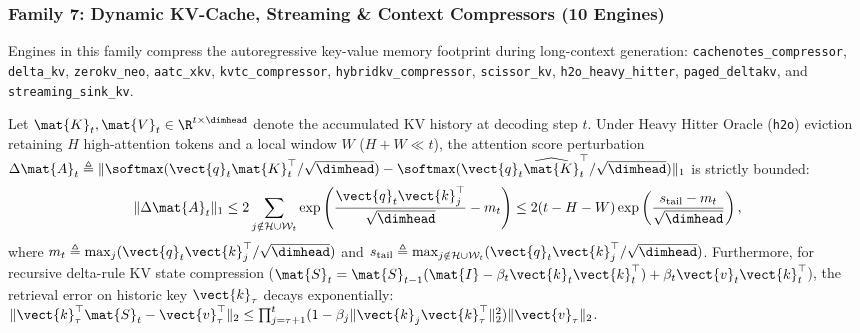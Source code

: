 \subsubsection{Family 7: Dynamic KV-Cache, Streaming \& Context Compressors (10 Engines)}
Engines in this family compress the autoregressive key-value memory footprint during long-context generation: \texttt{cachenotes\_compressor}, \texttt{delta\_kv}, \texttt{zerokv\_neo}, \texttt{aatc\_xkv}, \texttt{kvtc\_compressor}, \texttt{hybridkv\_compressor}, \texttt{scissor\_kv}, \texttt{h2o\_heavy\_hitter}, \texttt{paged\_deltakv}, and \texttt{streaming\_sink\_kv}.
\begin{theorem}
\label{thm:frob_kv_cache_family}
Let $\mat{K}_t, \mat{V}_t \in \R^{t \times \dimhead}$ denote the accumulated KV history at decoding step $t$. Under Heavy Hitter Oracle (\texttt{h2o}) eviction retaining $H$ high-attention tokens and a local window $W$ ($H + W \ll t$), the attention score perturbation $\Delta \mat{A}_t \triangleq \|\softmax(\vect{q}_t \mat{K}_t^\top / \sqrt{\dimhead}) - \softmax(\vect{q}_t \widehat{\mat{K}}_t^\top / \sqrt{\dimhead})\|_1$ is strictly bounded:
\begin{equation}
\|\Delta \mat{A}_t\|_1 \le 2 \sum_{j \notin \mathcal{H} \cup \mathcal{W}_t} \exp\left(\frac{\vect{q}_t \vect{k}_j^\top}{\sqrt{\dimhead}} - m_t\right) \le 2 (t - H - W) \exp\left(\frac{s_{\text{tail}} - m_t}{\sqrt{\dimhead}}\right),
\label{eq:frob_bound_kv_family}
\end{equation}
where $m_t \triangleq \max_{j} (\vect{q}_t \vect{k}_j^\top / \sqrt{\dimhead})$ and $s_{\text{tail}} \triangleq \max_{j \notin \mathcal{H} \cup \mathcal{W}_t} (\vect{q}_t \vect{k}_j^\top / \sqrt{\dimhead})$. Furthermore, for recursive delta-rule KV state compression ($\mat{S}_t = \mat{S}_{t-1}(\mat{I} - \beta_t \vect{k}_t \vect{k}_t^\top) + \beta_t \vect{v}_t \vect{k}_t^\top$), the retrieval error on historic key $\vect{k}_\tau$ decays exponentially: $\|\vect{k}_\tau^\top \mat{S}_t - \vect{v}_\tau^\top\|_2 \le \prod_{j=\tau+1}^t (1 - \beta_j \|\vect{k}_j \vect{k}_\tau^\top\|_2^2) \|\vect{v}_\tau\|_2$.
\end{theorem}

